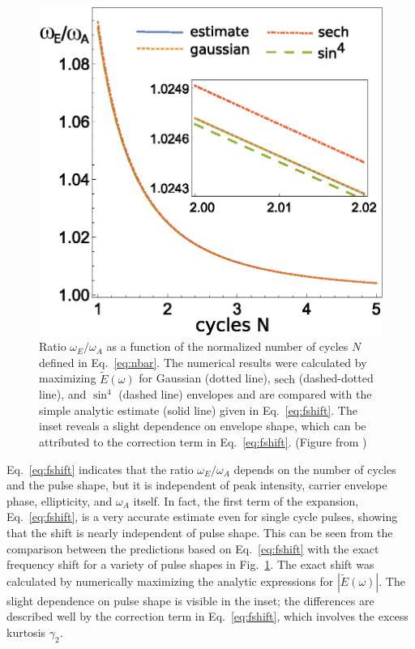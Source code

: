 \begin{figure}[!ht]
\centering
    \includegraphics[width=0.5\linewidth]{figs/Frequency_shift/fshift51.eps}
\caption{Ratio $\omega_E/\omega_A$ as a function of the normalized number of cycles $ N$ defined in Eq.~\ref{eq:nbar}. The numerical results were calculated by maximizing $\tilde{E}(\omega)$ for Gaussian (dotted line), $\text{sech}$ (dashed-dotted line), and $\sin^4$ (dashed line) envelopes and are compared with the simple analytic estimate (solid line) given in Eq.~\ref{eq:fshift}. The inset reveals a slight dependence on envelope shape, which can be attributed to the correction term in Eq.~\ref{eq:fshift}. (Figure from \cite{venzke2018_Central})
}
  \label{fig:shift}
\end{figure}

Eq.~\ref{eq:fshift} indicates that the ratio $\omega_E/\omega_A$ depends on the number of cycles and the pulse shape, but it is independent of peak intensity, carrier envelope phase, ellipticity, and $\omega_A$ itself. In fact, the first term of the expansion, Eq.~\ref{eq:fshift}, is a very accurate estimate even for single cycle pulses, showing that the shift is nearly independent of pulse shape. This can be seen from the comparison between the predictions based on Eq.~\ref{eq:fshift} with the exact frequency shift for a variety of pulse shapes in Fig.~\ref{fig:shift}. The exact shift was calculated by numerically maximizing the analytic expressions for $|\tilde{E}(\omega)|$. The slight dependence on pulse shape is visible in the inset; the differences are described well by the correction term in Eq.~\ref{eq:fshift}, which involves the excess kurtosis $\gamma_2$.

